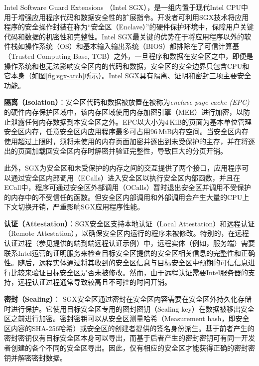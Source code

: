 Intel Software Guard Extensions （Intel SGX）\cite{sgx,sgx2}，是一组内置于现代Intel CPU中用于增强应用程序代码和数据安全性的扩展指令。开发者可利用SGX技术将应用程序的安全操作封装在称为“安全区（Enclave）”的硬件保护环境中，保障用户关键代码和数据的机密性和完整性。Intel SGX最关键的优势在于将应用程序以外的软件栈如操作系统（OS）和基本输入输出系统（BIOS）都排除在了可信计算基（Trusted Computing Base, TCB）之外，一旦程序和数据在安全区之中，即便是操作系统和也无法影响安全区内的代码和数据，安全区的安全边界只包含CPU和它本身（如图\ref{fig:sgx-arch}所示）。Intel SGX具有隔离、证明和密封三项主要安全功能。

\textbf{隔离（Isolation）}：安全区代码和数据被放置在被称为\textit{enclave page cache (EPC)}的硬件内存保护区域中，该内存区域使用内存加密引擎（MEE）进行加密，以防止泄露任何内存数据到本安全区之外。EPC以大小为4\,KiB的页面为基本单位管理安全区内存，任意安全区内应用程序最多可占用96\,MiB内存空间\cite{harnik2018SGX}。当安全区内存使用超过上限时，须将未使用的内存页面加密并逐出到未受保护的主存，并在将逐出的页面加载回安全区内存时解密并验证完整性，导致巨大的分页开销\cite{arnautov2016SCONE,dinhngoc2019Everything}。

此外，SGX为安全区和未受保护的内存之间的交互提供了两个接口，应用程序可以通过安全区内部调用（ECalls）进入安全区以执行安全区内部函数，并且在ECall中，程序可通过安全区外部调用（OCalls）暂时退出安全区并调用不受保护的内存中的不受信任的函数。但安全区内部调用和外部调用会产生大量的CPU上下文切换开销\cite{harnik2018SGX}，严重影响SGX应用程序性能。

\textbf{认证（Attestation）}：SGX安全区支持本地认证（Local Attestation）和远程认证（Remote Attestation），以确保安全区内运行的程序未被修改。特别的，在远程认证过程（参见\cite{SGX-RA}提供的端到端远程认证示例）中，远程实体（例如，服务端）需要联系Intel运营的证明服务来检查目标安全区提供的安全区相关信息的完整性和正确性。随后，远程实体通过将其收到的安全区信息与目标安全区中预期的可信信息进行比较来验证目标安全区是否未被修改。然而，由于远程认证需要Intel服务器的支持，远程认证过程通常导致较高且不可控的时间开销。

\textbf{密封（Sealing）}： SGX安全区通过密封在安全区内容需要在安全区外持久化存储时进行保护。它使用目标安全区专用的密封密钥（Sealing key）在数据被移出安全区之前进行加密。密封密钥可以从安全区测量哈希（Measurement hash，即安全区内容的SHA-256哈希）或安全区的创建者提供的签名身份派生。基于前者产生的密封密钥仅有目标安全区本身可以导出，而基于后者产生的密封密钥可有同一开发者创建的各个不同的安全区导出。因此，仅有相应的安全区才能获得正确的密封密钥并解密密封数据。

